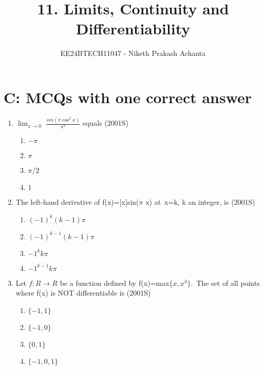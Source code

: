 \documentclass[journal,12pt,twocolumn]{IEEEtran}
\theoremstyle{remark}
\begin{document}

\vspace{3cm}

\title{11. Limits, Continuity and Differentiability }
\author{EE24BTECH11047 - Niketh Prakash Achanta}
\maketitle
\newpage
\bigskip
\section{C: MCQs with one correct answer}

\renewcommand{\thefigure}{\theenumi}
\renewcommand{\thetable}{\theenumi}
\begin{enumerate}[start=17]
\item %
{\begin{flushleft}
 $\lim_{x\to0}$  $\frac{sin(\pi \cos^2 x )}{x^2}$ \: equals \hfill{(2001S)}
    \begin{enumerate}
     \item $-\pi$
     \item $\pi$
     \item $\pi/2$
     \item $1$\\
     \end{enumerate}
\end{flushleft}}

\item %
{\begin{flushleft}
    The left-hand derivative of f(x)=[x]sin($\pi$ x) at\ x=k, k an integer, is \hfill{(2001S)}
    \begin{enumerate}
     \item $(-1)^k (k-1) \pi$
     \item $(-1)^{k-1} (k-1) \pi$
     \item $-1^k k\pi$
     \item $-1^{k-1} k\pi$\\
    \end{enumerate}
\end{flushleft}}

\item %
{\begin{flushleft}
    Let $f:R\rightarrow R$ be a function defined by f(x)=max$\{x,x^3\}$.\ The set of all points where f(x) is NOT differentiable is \hfill{(2001S)}
    \begin{enumerate}
     \item $\{-1,1\}$
     \item $\{-1,0\}$
     \item $\{0,1\}$
     \item $\{-1,0,1\}$\\
    \end{enumerate}
\end{flushleft}}


\end{enumerate}
\end{document}
